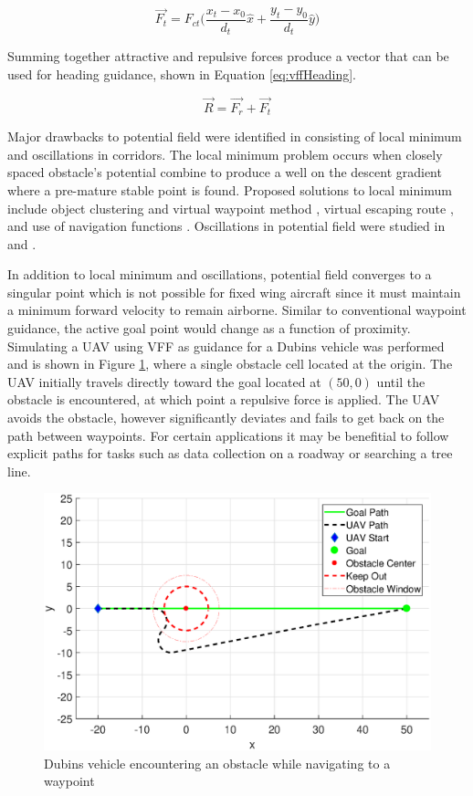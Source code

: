 \documentclass[conf]{new-aiaa}
\begin{document}
\begin{equation}\label{eq:vffGoal}
\overrightarrow{F_t} = F_{ct} \bigg( \frac{x_t-x_0}{d_{t}}\hat{x} + \frac{y_t-y_0}{d_{t}}\hat{y}\bigg)
\end{equation}

Summing together attractive and repulsive forces produce a vector that can be used for heading guidance, shown in Equation \ref{eq:vffHeading}.

\begin{equation}\label{eq:vffHeading}
\overrightarrow{R} = \overrightarrow{F_r} + \overrightarrow{F_t}
\end{equation}

 Major drawbacks to potential field were identified in \cite{koren_potential_1991} consisting of local minimum and oscillations in corridors. The local minimum problem occurs when closely spaced obstacle's potential combine to produce a well on the descent gradient where a pre-mature stable point is found. Proposed solutions to local minimum include object clustering and virtual waypoint method \cite{liu_virtual-waypoint_2016}, virtual escaping route \cite{kim_escaping_2009}, and use of navigation functions \cite{goerzen_survey_2010}. Oscillations in potential field were studied in \cite{lei_tang_novel_2010} and \cite{li_efficient_2012}.

In addition to local minimum and oscillations, potential field converges to a singular point which is not possible for fixed wing aircraft since it must maintain a minimum forward velocity to remain airborne. Similar to conventional waypoint guidance, the active goal point would change as a function of proximity. Simulating a UAV using VFF as guidance for a Dubins vehicle was performed and is shown in Figure \ref{fig:vffsimulated}, where a single obstacle cell located at the origin. The UAV initially travels directly toward the goal located at $(50,0)$ until the obstacle is encountered, at which point a repulsive force is applied. The UAV avoids the obstacle, however significantly deviates and fails to get back on the path between waypoints. For certain applications it may be benefitial to follow explicit paths for tasks such as data collection on a roadway or searching a tree line.


\begin{figure}[H]
	\centering
	\includegraphics[width=0.7\linewidth]{Figures/vffSimulated}
	\caption{Dubins vehicle encountering an obstacle while navigating to a waypoint}
	\label{fig:vffsimulated}
\end{figure} 
\end{document}

